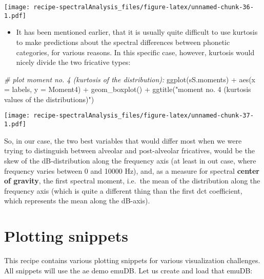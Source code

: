 \documentclass[
]{book}
\newenvironment{Shaded}{\begin{snugshade}}{\end{snugshade}}
\newcommand{\AttributeTok}[1]{\textcolor[rgb]{0.77,0.63,0.00}{#1}}
\newcommand{\CommentTok}[1]{\textcolor[rgb]{0.56,0.35,0.01}{\textit{#1}}}
\newcommand{\FunctionTok}[1]{\textcolor[rgb]{0.00,0.00,0.00}{#1}}
\newcommand{\NormalTok}[1]{#1}
\newcommand{\SpecialCharTok}[1]{\textcolor[rgb]{0.00,0.00,0.00}{#1}}
\newcommand{\StringTok}[1]{\textcolor[rgb]{0.31,0.60,0.02}{#1}}
\providecommand{\tightlist}{%
  \setlength{\itemsep}{0pt}\setlength{\parskip}{0pt}}
\begin{document}
\texttt{[image: recipe-spectralAnalysis\_files/figure-latex/unnamed-chunk-36-1.pdf]}

\begin{itemize}
\tightlist
\item
  It has been mentioned earlier, that it is usually quite difficult to use kurtosis to make predictions about the spectral differences between phonetic categories, for various reasons. In this specific case, however, kurtosis would nicely divide the two fricative types:
\end{itemize}

\begin{Shaded}
\begin{Highlighting}[]
\CommentTok{\# plot moment no. 4 (kurtosis of the distribution):}
\FunctionTok{ggplot}\NormalTok{(sS.moments) }\SpecialCharTok{+}
  \FunctionTok{aes}\NormalTok{(}\AttributeTok{x =}\NormalTok{ labels, }\AttributeTok{y =}\NormalTok{ Moment4) }\SpecialCharTok{+}
  \FunctionTok{geom\_boxplot}\NormalTok{() }\SpecialCharTok{+}
  \FunctionTok{ggtitle}\NormalTok{(}\StringTok{"moment no. 4 (kurtosis values of the distributions)"}\NormalTok{)}
\end{Highlighting}
\end{Shaded}

\texttt{[image: recipe-spectralAnalysis\_files/figure-latex/unnamed-chunk-37-1.pdf]}

So, in our case, the two best variables that would differ most when we were trying to distinguish between alveolar and post-alveolar fricatives, would be the skew of the dB-distribution along the frequency axis (at least in out case, where frequency varies between 0 and 10000 Hz), and, as a measure for spectral \textbf{center of gravity}, the first spectral moment, i.e.~the mean of the distribution along the frequency axis (which is quite a different thing than the first dct coefficient, which represents the mean along the dB-axis).

\hypertarget{recipe:plottingSnippets}{%
\chapter{Plotting snippets}\label{recipe:plottingSnippets}}

This recipe contains various plotting snippets for various visualization challenges. All snippets will use the ae demo emuDB. Let us create and load that emuDB:
\end{document}

